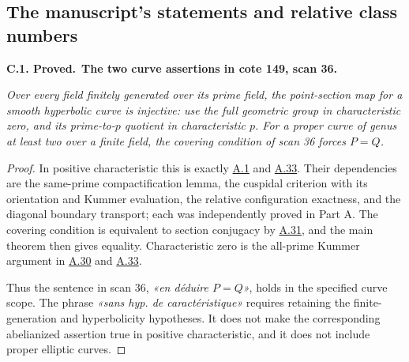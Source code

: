 \documentclass[11pt,a4paper]{article}
\newenvironment{claim}[3]{\par\medskip\noindent\hypertarget{#1}{\textbf{#1. #2.}}\ \textbf{#3.}\par\nopagebreak\smallskip\begingroup\itshape}{\endgroup\par\smallskip}
\newcommand{\statementref}[1]{\hyperlink{#1}{#1}}
\begin{document}
\subsection{The manuscript's statements and relative class numbers}

\begin{claim}{C.1}{Proved}{The two curve assertions in cote 149, scan 36}
Over every field finitely generated over its prime field, the
point-section map for a smooth hyperbolic curve is injective:
use the full geometric group in characteristic zero, and its
prime-to-$p$ quotient in characteristic $p$. For a proper curve
of genus at least two over a finite field, the covering condition
of scan 36 forces $P=Q$.
\end{claim}
\begin{proof}
In positive characteristic this is exactly
\statementref{A.1} and \statementref{A.33}. Their dependencies
are the same-prime compactification lemma, the cuspidal criterion
with its orientation and Kummer evaluation, the relative
configuration exactness, and the diagonal boundary transport;
each was independently proved in Part A. The covering condition
is equivalent to section conjugacy by \statementref{A.31}, and
the main theorem then gives equality. Characteristic zero is the
all-prime Kummer argument in \statementref{A.30} and
\statementref{A.33}.

Thus the sentence in scan 36, \emph{«en déduire $P=Q$»}, holds in
the specified curve scope. The phrase
\emph{«sans hyp. de caractéristique»} requires retaining the
finite-generation and hyperbolicity hypotheses. It does not make
the corresponding abelianized assertion true in positive
characteristic, and it does not include proper elliptic curves.
\end{proof}
\end{document}
